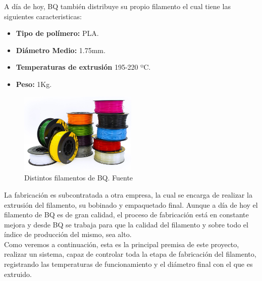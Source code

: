 A día de hoy, BQ también distribuye su propio filamento el cual tiene las siguientes caracteristicas:
\begin{itemize}
    \item \textbf{Tipo de polímero:} PLA.
    \item \textbf{Diámetro Medio:} 1.75mm.
    \item \textbf{Temperaturas de extrusión} 195-220 ºC.
    \item \textbf{Peso:} 1Kg.
\end{itemize}
\begin{figure}[H]
        \centering
        \includegraphics[width=0.5\textwidth]{images/filamento_bq.png}
        \caption{Distintos filamentos de BQ. Fuente \cite{bq}}
        \label{fig:estado_filamento}
\end{figure}
La fabricación es subcontratada a otra empresa, la cual se encarga de realizar la extrusión del filamento, su bobinado y empaquetado final. Aunque a día de hoy el filamento de BQ es de gran calidad, el proceso de fabricación está en constante mejora y desde BQ se trabaja para que la calidad del filamento y sobre todo el índice de producción del mismo, sea alto.\\

Como veremos a continuación, esta es la principal premisa de este proyecto, realizar un sistema, capaz de controlar toda la etapa de fabricación del filamento, registrando las temperaturas de funcionamiento y el diámetro final con el que es extruido.\\




